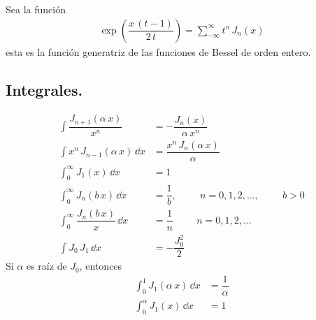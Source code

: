 Sea la función
\begin{align*}
\exp(\dfrac{x \, (t - 1)}{2 \, t}) = \sum_{-\infty}^{\infty} t^{n} \, J_{n} (x)
\end{align*}
esta es la función generatriz de las funciones de Bessel de orden entero.
\subsection{Integrales.}
\begin{align*}
\int \dfrac{J_{n+1} (\alpha \, x)}{x^{n}} &= - \dfrac{J_{n}(x)}{\alpha \, x^{n}} \\[1em]
\int x^{n} \, J_{n-1} (\alpha \, x) \, \dd x &= \dfrac{x^{n} \, J_{n}(\alpha \, x)}{\alpha} \\[1em]
\int_{0}^{\infty} J_{1}(x) \, \dd x &= 1 \\[1em]
\int_{0}^{\infty} J_{n} (b \, x) \, \dd x &= \dfrac{1}{b}, \hspace{1cm} n = 0, 1, 2, \ldots, \hspace{1cm} b > 0 \\[1em]
\int_{0}^{\infty} \dfrac{J_{n} (b \, x)}{x} \, \dd x &= \dfrac{1}{n} \hspace{1cm} n = 0, 1, 2, \ldots \\[1em]
\int J_{0} \, J_{1} \, \dd x &= - \dfrac{J_{0}^{2}}{2}
\end{align*}
Si $\alpha$ es raíz de $J_{0}$, entonces
\begin{align*}
\int_{0}^{1} J_{1} (\alpha \, x) \, \dd x &= \dfrac{1}{\alpha} \\[1em]
\int_{0}^{\alpha} J_{1} (x) \, \dd x &= 1
\end{align*}
